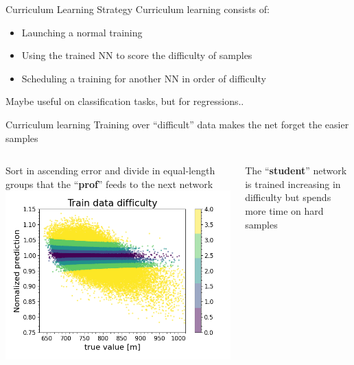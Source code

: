 \documentclass{beamer}
\begin{document}

\begin{frame}{Curriculum Learning Strategy}
    Curriculum learning consists of:
    \begin{itemize}
        \item Launching a normal training
        \item Using the trained NN to score the difficulty of samples
        \item Scheduling a training for another NN in order of difficulty
    \end{itemize}
    \vfill
    Maybe useful on classification tasks, but for regressions..
\end{frame}

\begin{frame}{Curriculum learning}
    Training over ``difficult'' data makes the net forget the easier samples
    \vfill
    \begin{columns}
        \begin{column}{.5\textwidth}
            Sort in ascending error and divide in equal-length groups that the ``\textbf{prof}'' feeds to the next network
            \includegraphics[width=\textwidth]{figures/curriculum_before.png}
        \end{column}
        \begin{column}{.5\textwidth}
            The ``\textbf{student}'' network is trained increasing in difficulty but spends more time on 
            hard samples

\end{column}
\end{columns}
\end{frame}
\end{document}
